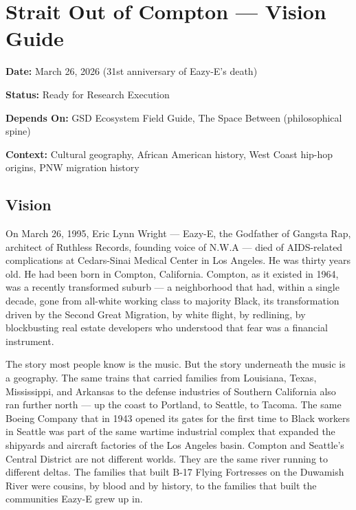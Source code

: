 \documentclass[11pt,letterpaper]{article}
\newcommand{\stageheader}[2]{%
  \noindent\colorbox{#2}{\makebox[\textwidth][l]{%
    \textcolor{white}{\bfseries\sffamily\hspace{6pt}#1\hspace{6pt}}}}%
  \vspace{0.5em}\par%
}
\newcommand{\metafield}[2]{\textbf{\sffamily #1} #2\par}
\begin{document}
\tableofcontents
\newpage

\stageheader{STAGE 1 --- VISION DOCUMENT}{primary}

\section{Strait Out of Compton --- Vision Guide}

\metafield{Date:}{March 26, 2026 (31st anniversary of Eazy-E's death)}
\metafield{Status:}{Ready for Research Execution}
\metafield{Depends On:}{GSD Ecosystem Field Guide, The Space Between (philosophical spine)}
\metafield{Context:}{Cultural geography, African American history, West Coast hip-hop origins, PNW migration history}

\subsection{Vision}

On March 26, 1995, Eric Lynn Wright --- Eazy-E, the Godfather of Gangsta Rap, architect of Ruthless Records, founding voice of N.W.A --- died of AIDS-related complications at Cedars-Sinai Medical Center in Los Angeles. He was thirty years old. He had been born in Compton, California. Compton, as it existed in 1964, was a recently transformed suburb --- a neighborhood that had, within a single decade, gone from all-white working class to majority Black, its transformation driven by the Second Great Migration, by white flight, by redlining, by blockbusting real estate developers who understood that fear was a financial instrument.

The story most people know is the music. But the story underneath the music is a geography. The same trains that carried families from Louisiana, Texas, Mississippi, and Arkansas to the defense industries of Southern California also ran further north --- up the coast to Portland, to Seattle, to Tacoma. The same Boeing Company that in 1943 opened its gates for the first time to Black workers in Seattle was part of the same wartime industrial complex that expanded the shipyards and aircraft factories of the Los Angeles basin. Compton and Seattle's Central District are not different worlds. They are the same river running to different deltas. The families that built B-17 Flying Fortresses on the Duwamish River were cousins, by blood and by history, to the families that built the communities Eazy-E grew up in.
\end{document}
